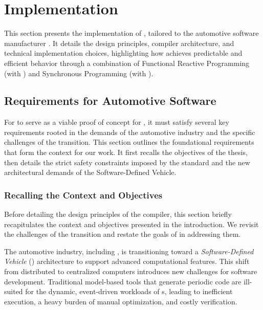 \section{Implementation}
\label{sec:grust:implem}

This section presents the implementation of \GRust, tailored to the automotive software manufacturer
\ampere.
%
It details the design principles, compiler architecture, and technical implementation
choices, highlighting how \GRust achieves predictable and efficient behavior through a combination
of Functional Reactive Programming (with \GRFRP) and Synchronous Programming (with \GRSync).

\subsection{Requirements for Automotive Software}
\label{sec:grust:implem:requirements}

For \GRust to serve as a viable proof of concept for \ampere, it must satisfy several key
requirements rooted in the demands of the automotive industry and the specific challenges of the
\sdv transition. This section outlines the foundational requirements that form the context for our
work. It first recalls the objectives of the thesis, then details the strict safety constraints
imposed by the \iso standard and the new architectural demands of the Software-Defined Vehicle.


\subsubsection{Recalling the Context and Objectives}
\label{sec:grust:implem:recap}

Before detailing the design principles of the \GRust compiler, this section briefly
recapitulates the context and objectives presented in the introduction. We revisit the
challenges of the \sdv transition and restate the goals of \GRust in addressing them.

The automotive industry, including \ampere, is transitioning toward a
\emph{Software-Defined Vehicle} (\sdv) architecture to support advanced computational
features. This shift from distributed \ecus to centralized computers introduces new
challenges for software development. Traditional model-based tools that generate periodic
\Ci code are ill-suited for the dynamic, event-driven workloads of \sdv{}s, leading to
inefficient execution, a heavy burden of manual optimization, and costly verification.

